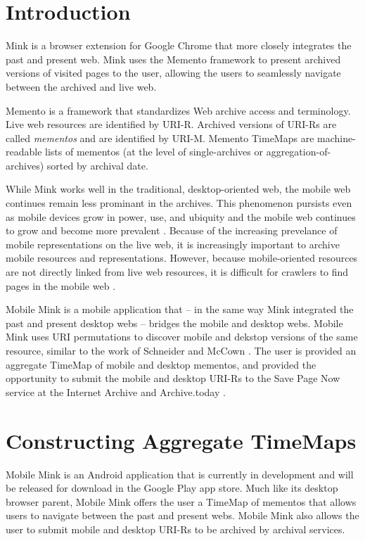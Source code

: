 \documentclass{sig-alternate}
\begin{document}

\section{Introduction}
\label{introduction}
Mink \cite{mink} is a browser extension for Google Chrome that more closely integrates the past and present web. Mink uses the Memento framework \cite{nelson:memento:tr} to present archived versions of visited pages to the user, allowing the users to seamlessly navigate between the archived and live web.

Memento is a framework that standardizes Web archive access and terminology. Live web resources are identified by URI-R. Archived versions of URI-Rs are called \emph{mementos} and are identified by URI-M. Memento TimeMaps are machine-readable lists of mementos (at the level of single-archives or aggregation-of-archives) sorted by archival date.

While Mink works well in the traditional, desktop-oriented web, the mobile web continues remain less prominant in the archives. This phenomenon pursists even as mobile devices grow in power, use, and ubiquity and the mobile web continues to grow and become more prevalent \cite{mobileWeb}. Because of the increasing prevelance of mobile representations on the live web, it is increasingly important to archive mobile resources and representations. However, because mobile-oriented resources are not directly linked from live web resources, it is difficult for crawlers to find pages in the mobile web \cite{4544648}.

Mobile Mink is a mobile application that -- in the same way Mink integrated the past and present desktop webs -- bridges the mobile and desktop webs. Mobile Mink uses URI permutations to discover mobile and dekstop versions of the same resource, similar to the work of Schneider and McCown \cite{frankMobile}. The user is provided an aggregate TimeMap of mobile and desktop mementos, and provided the opportunity to submit the mobile and desktop URI-Rs to the Save Page Now service at the Internet Archive  \cite{savePage} and Archive.today \cite{archivetoday}.


\section{Constructing Aggregate TimeMaps}
\label{timemaps}
Mobile Mink is an Android application that is currently in development and will be released for download in the Google Play app store.
Much like its desktop browser parent, Mobile Mink offers the user a TimeMap of mementos that allows users to navigate between the past and present webs. Mobile Mink also allows the user to submit mobile and desktop URI-Rs to be archived by archival services.
\end{document}
